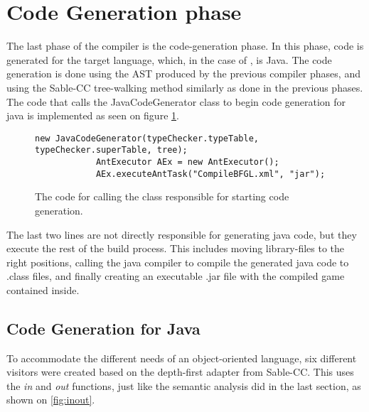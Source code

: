 \section{Code Generation phase}
The last phase of the compiler is the code-generation phase. In this phase, code is generated for the target language, which, in the case of \lang{}, is Java. The code generation is done using the AST produced by the previous compiler phases, and using the Sable-CC tree-walking method similarly as done in the previous phases. The code that calls the JavaCodeGenerator class to begin code generation for java is implemented as seen on figure \ref{fig:startcodegen}.

\begin{figure}[H]
    \centering
    
    \begin{lstlisting}[style=gglang]
            new JavaCodeGenerator(typeChecker.typeTable, typeChecker.superTable, tree);
            AntExecutor AEx = new AntExecutor();
            AEx.executeAntTask("CompileBFGL.xml", "jar");
    \end{lstlisting}
    \caption{The code for calling the class responsible for starting code generation.\label{fig:startcodegen}}
\end{figure}
The last two lines are not directly responsible for generating java code, but they execute the rest of the build process. This includes moving library-files to the right positions, calling the java compiler to compile the generated java code to .class files, and finally creating an executable .jar file with the compiled game contained inside.

\subsection{Code Generation for Java}
To accommodate the different needs of an object-oriented language, six different visitors were created based on the depth-first adapter from Sable-CC.
This uses the \textit{in} and \textit{out} functions, just like the semantic analysis did in the last section, as shown on \ref{fig:inout}.


